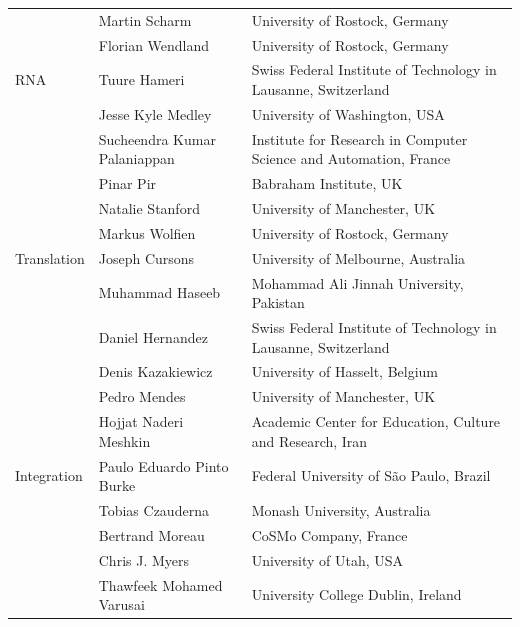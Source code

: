 \documentclass[journal,transmag]{IEEEtran}
\begin{document}
\begin{table}[ht!]
\begin{tabularx}{\textwidth}{l||l||X}
                       & Martin Scharm                    & University of Rostock, Germany\\
                       & Florian Wendland                 & University of Rostock, Germany\\\hline
RNA                    & Tuure Hameri                     & Swiss Federal Institute of Technology in Lausanne, Switzerland\\
                       & Jesse Kyle Medley                & University of Washington, USA\\
                       & Sucheendra Kumar Palaniappan     & Institute for Research in Computer Science and Automation, France\\
                       & Pinar Pir                        & Babraham Institute, UK\\
                       & Natalie Stanford                 & University of Manchester, UK\\
                       & Markus Wolfien                   & University of Rostock, Germany\\\hline
Translation            & Joseph Cursons                   & University of Melbourne, Australia\\
                       & Muhammad Haseeb                  & Mohammad Ali Jinnah University, Pakistan\\
                       & Daniel Hernandez                 & Swiss Federal Institute of Technology in Lausanne, Switzerland\\
                       & Denis Kazakiewicz                & University of Hasselt, Belgium\\
                       & Pedro Mendes                     & University of Manchester, UK\\
                       & Hojjat Naderi Meshkin            & Academic Center for Education, Culture and Research, Iran\\\hline
Integration            & Paulo Eduardo Pinto Burke        & Federal University of S\~ao Paulo, Brazil\\
                       & Tobias Czauderna                 & Monash University, Australia\\
                       & Bertrand Moreau                  & CoSMo Company, France\\
                       & Chris J. Myers                   & University of Utah, USA\\
		               & Thawfeek Mohamed Varusai         & University College Dublin, Ireland\\

\end{tabularx}
\end{table}
\end{document}
